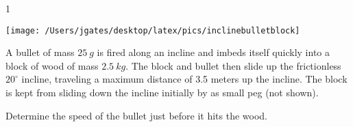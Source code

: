 
\AddToShipoutPicture*{\BackgroundPic}

\addtocounter {ProbNum} {1}

\begin{floatingfigure}[r]{.42\textwidth}
\texttt{[image: /Users/jgates/desktop/latex/pics/inclinebulletblock]}
\end{floatingfigure}
 
{\bf \Large{}} A bullet of mass $25~g$ is fired along an incline and imbeds itself quickly into a block of wood of mass $2.5~kg$. The block and bullet then slide up the frictionless $20^{\circ}$ incline, traveling a maximum distance of 3.5 meters up the incline. The block is kept from sliding down the incline initially by as small peg (not shown).

\bigskip
Determine the speed of the bullet just before it hits the wood.\paragraph{}
\noindent
\vfill

\newpage